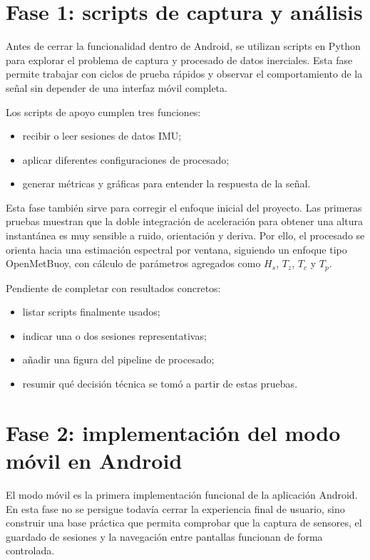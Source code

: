 \section{Fase 1: scripts de captura y análisis}

Antes de cerrar la funcionalidad dentro de Android, se utilizan scripts en Python para explorar el problema de captura y procesado de datos inerciales. Esta fase permite trabajar con ciclos de prueba rápidos y observar el comportamiento de la señal sin depender de una interfaz móvil completa.

Los scripts de apoyo cumplen tres funciones:

\begin{itemize}
  \item recibir o leer sesiones de datos IMU;
  \item aplicar diferentes configuraciones de procesado;
  \item generar métricas y gráficas para entender la respuesta de la señal.
\end{itemize}

Esta fase también sirve para corregir el enfoque inicial del proyecto. Las primeras pruebas muestran que la doble integración de aceleración para obtener una altura instantánea es muy sensible a ruido, orientación y deriva. Por ello, el procesado se orienta hacia una estimación espectral por ventana, siguiendo un enfoque tipo OpenMetBuoy, con cálculo de parámetros agregados como \(H_s\), \(T_z\), \(T_c\) y \(T_p\).

\begin{temporalblock}
Pendiente de completar con resultados concretos:
\begin{itemize}
  \item listar scripts finalmente usados;
  \item indicar una o dos sesiones representativas;
  \item añadir una figura del pipeline de procesado;
  \item resumir qué decisión técnica se tomó a partir de estas pruebas.
\end{itemize}
\end{temporalblock}

\section{Fase 2: implementación del modo móvil en Android}

El modo móvil es la primera implementación funcional de la aplicación Android. En esta fase no se persigue todavía cerrar la experiencia final de usuario, sino construir una base práctica que permita comprobar que la captura de sensores, el guardado de sesiones y la navegación entre pantallas funcionan de forma controlada.

